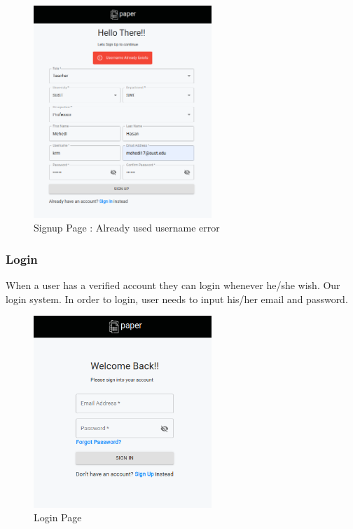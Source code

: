 \documentclass[10pt]{article}
\begin{document}
\begin{figure}[H]
  \centering
  \centerline{\includegraphics[width=0.6\textwidth]{signup/signup-error-u.png}}
  \caption{Signup Page : Already used username error}
  \label{fig}
\end{figure}


\subsubsection{Login}

When a user has a verified account they can login whenever he/she wish. Our login system.
In order to login, user needs to input his/her email and password.

\begin{figure}[H]
  \centering
  \centerline{\includegraphics[width=0.6\textwidth]{login/login.png}}
  \caption{Login Page}
  \label{fig}
\end{figure}
\end{document}
